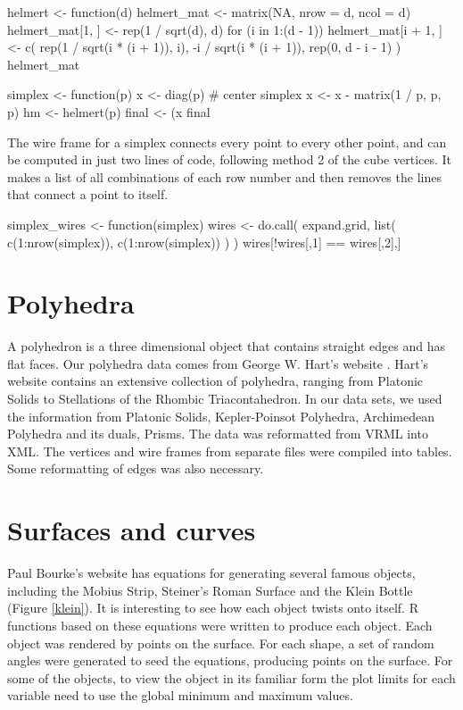 \begin{example}
helmert <- function(d) {
  helmert_mat <- matrix(NA, nrow = d, ncol = d)
  helmert_mat[1, ] <- rep(1 / sqrt(d), d)
  for (i in 1:(d - 1)) {
    helmert_mat[i + 1, ] <- c(
      rep(1 / sqrt(i * (i + 1)), i),
      -i / sqrt(i * (i + 1)),
      rep(0, d - i - 1)
    )
  }
  helmert_mat
}

simplex <- function(p) {
  x <- diag(p)
  # center simplex
  x <- x - matrix(1 / p, p, p)
  hm <- helmert(p)
  final <- (x %
  final
}
\end{example}

The wire frame for a simplex connects every point to every other point, and can
be computed in just two lines of code, following method 2 of the cube
vertices. It makes a list of all combinations of each row number and then
removes the lines that connect a point to itself.

\begin{example}
simplex_wires <- function(simplex) {
  wires <- do.call(
    expand.grid,
    list(
      c(1:nrow(simplex)),
      c(1:nrow(simplex))
    )
  )
  wires[!wires[,1] == wires[,2],]
}
\end{example}

\section{Polyhedra}

A polyhedron is a three dimensional object that contains straight
edges and has flat faces. Our polyhedra data comes from George
W. Hart's website \citep{GeorgeVP}. Hart's website contains an
extensive collection of polyhedra, ranging from Platonic Solids to
Stellations of the Rhombic Triacontahedron. In our data sets, we used
the information from Platonic Solids, Kepler-Poinsot Polyhedra,
Archimedean Polyhedra and its duals, Prisms. The data was reformatted
from VRML into XML. The vertices and wire frames from separate
files were compiled into tables. Some reformatting of edges was also
necessary.

\section{Surfaces and curves}

Paul Bourke's website \citep{PBCurves} has equations for generating
several famous objects, including the Mobius Strip, Steiner's Roman
Surface and the Klein Bottle (Figure \ref{klein}). It is interesting to see how each object
twists onto itself.  R functions based on these equations were written
to produce each object.  Each object was rendered by points on the
surface. For each shape, a set of random angles were generated to seed
the equations, producing points on the surface.  For some of the
objects, to view the object in its familiar form the plot limits for each
variable need to use the global minimum and maximum values.

